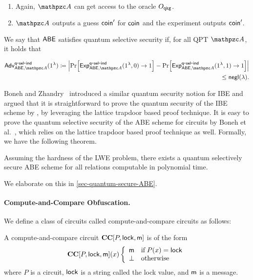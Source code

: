 \begin{definition}
\begin{enumerate}
\item Again, $\qA$ can get access to the oracle $O_{\mathtt{qkg}}$.
\item $\qA$ outputs a guess $\mathsf{coin}^\prime$ for $\mathsf{coin}$ and the
experiment outputs $\mathsf{coin}'$.
\end{enumerate}
We say that $\mathsf{ABE}$ satisfies quantum selective security if, for all
QPT $\qA$, it holds that

\begin{align}
\advc{\ABE,\qA}{q}{sel}{ind}(1^\secp) \seteq \abs{\Pr[\expc{\ABE,\qA}{q}{sel}{ind} (1^\secp,0) \ra 1] - \Pr[\expc{\ABE,\qA}{q}{sel}{ind} (1^\secp,1) \ra 1] }\\\leq \negl(\secp).
\end{align}
\end{definition}

Boneh and Zhandry~\cite{C:BonZha13} introduced a similar quantum security notion for IBE and argued that it is straightforward to prove the quantum security of the IBE scheme by \cite{EC:AgrBonBoy10}, by leveraging the lattice trapdoor based proof technique.
It is easy to prove the quantum selective security of the ABE scheme for circuits by Boneh et al.~\cite{EC:BGGHNS14}, which relies on the lattice trapdoor based proof technique as well.
Formally, we have the following theorem.
\begin{theorem}
Assuming the hardness of the LWE problem, there exists a quantum selectively secure ABE scheme for all relations computable in polynomial time.
\end{theorem}
We elaborate on this in \cref{sec-quantum-secure-ABE}.





\ifnum{}
\else
\paragraph{Compute-and-Compare Obfuscation.}
We define a class of circuits called compute-and-compare circuits as
follows:

\begin{definition}\label{def:cc_circuits_searchability}
A compute-and-compare circuit $\mathbf{CC}[P,\mathsf{lock},\mathsf{m}]$ is of the form
\[
\mathbf{CC}[P,\mathsf{lock},\mathsf{m}](x)\left\{
\begin{array}{ll}
    \mathsf{m}&\textrm{if}\; P(x)=\mathsf{lock}\\
\bot&\text{otherwise}~
\end{array}
\right.
\]
where $P$ is a circuit, $\mathsf{lock}$ is a string called the lock value,
and $\mathsf{m}$ is a message.
\end{definition}

